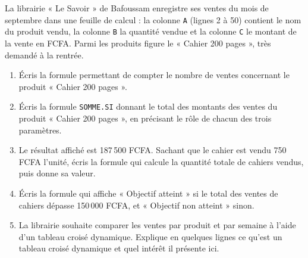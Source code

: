 \documentclass[11pt]{article}
\begin{document}
\begin{exercice}
La librairie « Le Savoir » de Bafoussam enregistre ses ventes du mois de septembre dans une feuille de calcul : la colonne \texttt{A} (lignes 2 à 50) contient le nom du produit vendu, la colonne \texttt{B} la quantité vendue et la colonne \texttt{C} le montant de la vente en FCFA. Parmi les produits figure le « Cahier 200 pages », très demandé à la rentrée.
\begin{enumerate}
\item Écris la formule permettant de compter le nombre de ventes concernant le produit « Cahier 200 pages ».
\item Écris la formule \texttt{SOMME.SI} donnant le total des montants des ventes du produit « Cahier 200 pages », en précisant le rôle de chacun des trois paramètres.
\item Le résultat affiché est 187\,500 FCFA. Sachant que le cahier est vendu 750 FCFA l'unité, écris la formule qui calcule la quantité totale de cahiers vendus, puis donne sa valeur.
\item Écris la formule qui affiche « Objectif atteint » si le total des ventes de cahiers dépasse 150\,000 FCFA, et « Objectif non atteint » sinon.
\item La librairie souhaite comparer les ventes par produit et par semaine à l'aide d'un tableau croisé dynamique. Explique en quelques lignes ce qu'est un tableau croisé dynamique et quel intérêt il présente ici.
\end{enumerate}
\end{exercice}
\end{document}

